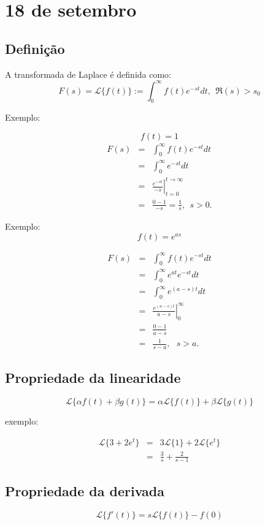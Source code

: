 \documentclass[a4paper,10pt]{book}
\title{}
\author{}
\begin{document}
\chapter{18 de setembro}

\section{Definição}

A transformada de Laplace é definida como:
$$F(s)=\mathcal{L}\{ f(t)\} := \int_0^\infty f(t)e^{-st}dt,~~\Re(s)>s_0$$

 Exemplo:
 
 $$f(t)=1$$
 \begin{eqnarray*}
  F(s) &=& \int_0^\infty f(t)e^{-st}dt\\
  &=&\int_0^\infty e^{-st}dt\\
  &=&\left.\frac{e^{-st}}{-s}\right|_{t=0}^{t \to \infty}\\
  &=& \frac{0-1}{-s}=\frac{1}{s}, ~~s>0.
 \end{eqnarray*}
% 

Exemplo:
 $$f(t)=e^{as}$$
 
 
 \begin{eqnarray*}
  F(s) &=& \int_0^\infty f(t)e^{-st}dt\\
  &=&\int_0^\infty e^{at}e^{-st}dt\\
    &=&\int_0^\infty e^{(a-s)t}dt\\
    &=&\left.\frac{e^{(a-s)t}}{a-s}\right|_0^\infty\\
    &=&\frac{0-1}{a-s}\\
    &=&\frac{1}{s-a},~~~s>a.
 \end{eqnarray*}
% 
% 
% 
 \section{Propriedade da linearidade}
% 
 $$\mathcal{L}\{\alpha f(t)+\beta g(t)\}=\alpha\mathcal{L}\{ f(t)\}+\beta\mathcal{L}\{ g(t)\}$$

 exemplo:
 
 \begin{eqnarray*}
\mathcal{L}\{3+2 e^{t}\}&=&3\mathcal{L}\{ 1\}+2\mathcal{L}\{ e^t\} \\
&=&\frac{3}{s}+\frac{2}{s-1}
 \end{eqnarray*}

% 
 \section{Propriedade da derivada}
 $$\mathcal{L}\{f'(t)\}=s\mathcal{L}\{ f(t)\}-f(0)$$
\end{document}
